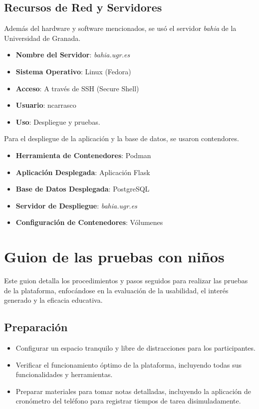 \begin{appendices}
\section{Recursos de Red y Servidores}

Además del hardware y software mencionados, se usó el servidor \textit{bahia} de la Universidad de Granada.

\begin{itemize}
    \item \textbf{Nombre del Servidor}: \textit{bahia.ugr.es}
    \item \textbf{Sistema Operativo}: Linux (Fedora)
    \item \textbf{Acceso}: A través de SSH (Secure Shell)
    \item \textbf{Usuario}: ncarrasco
    \item \textbf{Uso}: Despliegue y pruebas.
\end{itemize}

Para el despliegue de la aplicación y la base de datos, se usaron contendores. 

\begin{itemize}
    \item \textbf{Herramienta de Contenedores}: Podman
    \item \textbf{Aplicación Desplegada}: Aplicación Flask
    \item \textbf{Base de Datos Desplegada}: PostgreSQL
    \item \textbf{Servidor de Despliegue}: \textit{bahia.ugr.es}
    \item \textbf{Configuración de Contenedores}: Vólumenes
\end{itemize}
\chapter{Guion de las pruebas con niños} \label{chap:guion}

Este guion detalla los procedimientos y pasos seguidos para realizar las pruebas de la plataforma, enfocándose en la evaluación de la usabilidad, el interés generado y la eficacia educativa.

\section{Preparación}
\begin{itemize}
    \item Configurar un espacio tranquilo y libre de distracciones para los participantes.
    \item Verificar el funcionamiento óptimo de la plataforma, incluyendo todas sus funcionalidades y herramientas.
    \item Preparar materiales para tomar notas detalladas, incluyendo la aplicación de cronómetro del teléfono para registrar tiempos de tarea disimuladamente.
\end{itemize}


\end{appendices}
